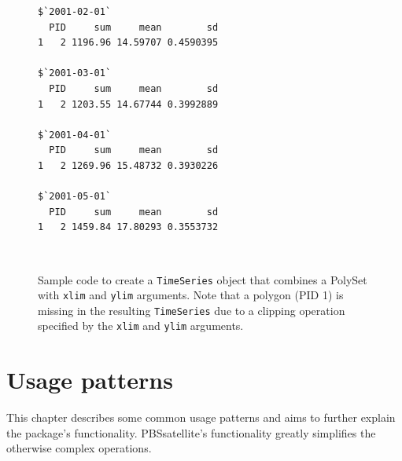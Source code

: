 \documentclass[11pt]{report}
\begin{document}
\begin{figure}
  \centering
  \begin{minipage}[b]{0.56\linewidth}
    \centering
    
  \end{minipage}\hfill
  \begin{minipage}[b]{0.40\linewidth}
    \centering
    \begin{lstlisting}[basicstyle=\ttfamily\footnotesize{}]
$`2001-02-01`
  PID     sum     mean        sd
1   2 1196.96 14.59707 0.4590395

$`2001-03-01`
  PID     sum     mean        sd
1   2 1203.55 14.67744 0.3992889

$`2001-04-01`
  PID     sum     mean        sd
1   2 1269.96 15.48732 0.3930226

$`2001-05-01`
  PID     sum     mean        sd
1   2 1459.84 17.80293 0.3553732
    \end{lstlisting}  
  \end{minipage}\\
  \begin{minipage}[t]{0.56\linewidth}
    \centering
  \end{minipage}\hfill
  \begin{minipage}[t]{0.40\linewidth}
    \centering
  \end{minipage}
  \caption{
    Sample code to create a \texttt{TimeSeries} object that combines a PolySet with \texttt{xlim} and \texttt{ylim} arguments.
    Note that a polygon (PID 1) is missing in the resulting \texttt{TimeSeries} due to a clipping operation specified by the \texttt{xlim} and \texttt{ylim} arguments.
  }
  \label{fig:ETS_out_2}
\end{figure}

\chapter{Usage patterns}
\label{c:UsagePatterns}

This chapter describes some common usage patterns and aims to further explain the package's functionality.
PBSsatellite's functionality greatly simplifies the otherwise complex operations.
\end{document}
